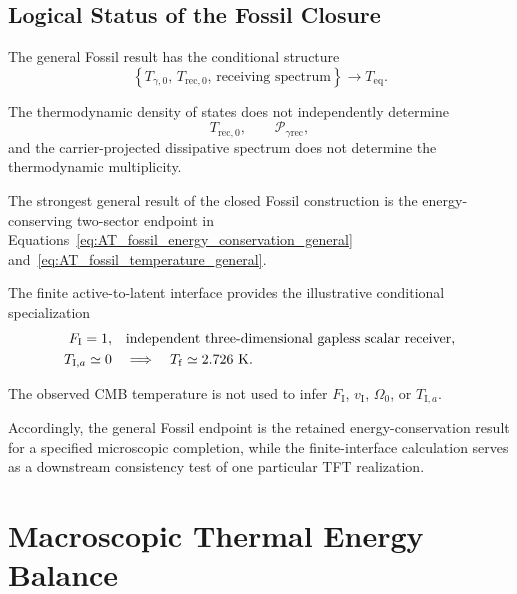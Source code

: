 \subsection{Logical Status of the Fossil Closure}

The general Fossil result has the conditional structure
\begin{equation}
    \left\{
        T_{\gamma,0},
        \,
        T_{\mathrm{rec},0},
        \,
        \text{receiving spectrum}
    \right\}
    \longrightarrow
    T_{\mathrm{eq}}.
    \label{eq:AT_fossil_conditional_status}
\end{equation}

The thermodynamic density of states does not independently determine
\begin{equation}
    T_{\mathrm{rec},0},
    \qquad
    \mathcal P_{\gamma\mathrm{rec}},
\end{equation}
and the carrier-projected dissipative spectrum does not determine the
thermodynamic multiplicity.

The strongest general result of the closed Fossil construction is the
energy-conserving two-sector endpoint in
Equations~\eqref{eq:AT_fossil_energy_conservation_general}
and~\eqref{eq:AT_fossil_temperature_general}.

The finite active-to-latent interface provides the illustrative conditional
specialization
\begin{equation}
    \begin{aligned}
        F_{\mathrm I}=1,
        \quad
        &\text{independent three-dimensional gapless scalar receiver},
        \\
        T_{\mathrm I,a}\simeq0
        \quad
        &\Longrightarrow
        \quad
        T_{\mathrm f}\simeq2.726~{\rm K}.
    \end{aligned}
    \label{eq:AT_interface_conditional_status}
\end{equation}

The observed CMB temperature is not used to infer
\(F_{\mathrm I}\),
\(v_{\mathrm I}\),
\(\Omega_0\),
or
\(T_{\mathrm I,a}\).

Accordingly, the general Fossil endpoint is the retained energy-conservation
result for a specified microscopic completion, while the finite-interface
calculation serves as a downstream consistency test of one particular TFT
realization.


\section{Macroscopic Thermal Energy Balance}

